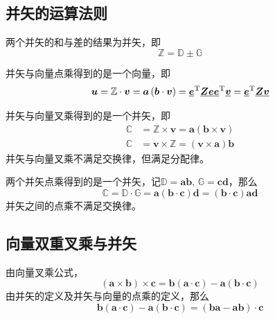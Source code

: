 \subsection{并矢的运算法则}
\sssection[并矢的线性运算]

两个并矢的和与差的结果为并矢，即
\begin{equation}
    \mathbb{Z} = \mathbb{D} \pm \mathbb{G}    
\end{equation}
\vspace*{0.1em}

\sssection[并矢与向量点乘]

并矢与向量点乘得到的是一个向量，即
\begin{equation}
    \bm{u} = \mathbb{Z} \cdot \bm{v} = \bm{a}\left(\bm{b} \cdot \bm{v}\right) = \underline{\bm{e}}^{\text{T}} \underline{\bm{Z}} \underline{\bm{e}} \underline{\bm{e}}^{\text{T}} \underline{\bm{v}} = \underline{\bm{e}}^{\text{T}} \underline{\bm{Z}} \underline{\bm{v}}
\end{equation}
\vspace*{0.1em}

\sssection[并矢与向量叉乘]

并矢与向量叉乘得到的是一个并矢，即
\begin{align}
    \mathbb{C} &= \mathbb{Z} \times \bm{v} = \bm{a}(\bm{b} \times \bm{v}) \\
    \mathbb{C} &= \bm{v} \times \mathbb{Z} = (\bm{v} \times \bm{a})\bm{b} 
\end{align}
并矢与向量叉乘不满足交换律，但满足分配律。
\vspace*{1em}

\sssection[并矢的并矢的点乘]

两个并矢点乘得到的是一个并矢，记$\mathbb{D} = \bm{a}\bm{b}, \, \mathbb{G} = \bm{c}\bm{d}$，那么
\begin{equation}
    \mathbb{C} = \mathbb{D} \cdot \mathbb{G} = \bm{a} (\bm{b} \cdot \bm{c}) \bm{d} = (\bm{b} \cdot \bm{c})\bm{a}\bm{d}
\end{equation}
并矢之间的点乘不满足交换律。
\vspace*{1em}


\subsection{向量双重叉乘与并矢}
由向量叉乘公式，
\begin{equation}
    (\bm{a} \times \bm{b}) \times \bm{c} = \bm{b}(\bm{a}\cdot\bm{c}) - \bm{a}(\bm{b} \cdot \bm{c})
\end{equation}
由并矢的定义及并矢与向量的点乘的定义，那么
\begin{equation}
    \bm{b}(\bm{a} \cdot \bm{c}) - \bm{a}(\bm{b} \cdot \bm{c}) = (\bm{b}\bm{a} - \bm{a}\bm{b})\cdot \bm{c}
\end{equation}

